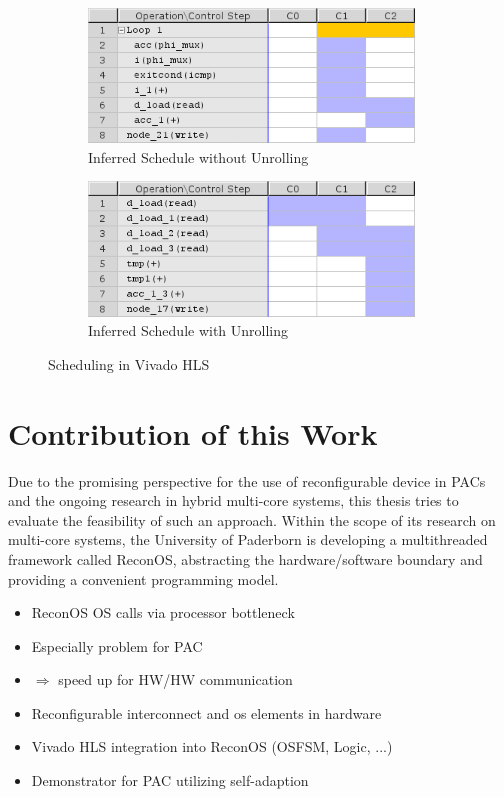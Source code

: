 \begin{figure}[tb]
	\centering
	\begin{subfigure}{0.49\textwidth}
		\centering
		\includegraphics[width=0.95\textwidth]{../figures/hls_n}
		\caption{Inferred Schedule without Unrolling}
		\label{fig:hls_n}
	\end{subfigure}
	\begin{subfigure}{0.49\textwidth}
		\centering
		\includegraphics[width=0.95\textwidth]{../figures/hls_u}
		\caption{Inferred Schedule with Unrolling}
		\label{fig:hls_u}
	\end{subfigure}
	\caption{Scheduling in Vivado HLS}
	\label{fig:hls}
\end{figure}

\section{Contribution of this Work}
Due to the promising perspective for the use of reconfigurable device  in
\acp{PAC} and the ongoing research in hybrid multi-core systems, this thesis
tries to evaluate the feasibility of such an approach. Within the scope of its
research on multi-core systems, the University of Paderborn is developing a
multithreaded framework called ReconOS, abstracting the hardware/software
boundary and providing a convenient programming model.

\begin{itemize}
\item ReconOS OS calls via processor bottleneck
\item Especially problem for PAC
\item $\Rightarrow$ speed up for HW/HW communication
\item Reconfigurable interconnect and os elements in hardware
\item Vivado HLS integration into ReconOS (OSFSM, Logic, ...)
\item Demonstrator for PAC utilizing self-adaption
\end{itemize}